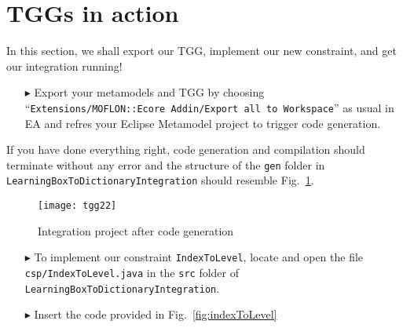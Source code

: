 \newpage
\section{TGGs in action}
\genHeader
\label{sect:TGGs_in_Action}
In this section, we shall export our TGG, implement our new constraint, and get our integration running!

\begin{enumerate}
\item[$\blacktriangleright$] Export your metamodels and TGG by choosing ``\texttt{Extensions/\-MOFLON::\-Ecore Addin\-/Export all to Workspace}'' as usual in EA and refres your Eclipse Metamodel project to trigger code generation.
\end{enumerate}

If you have done everything right, code generation and compilation should terminate without any error and the structure of the \texttt{gen} folder in \texttt{LearningBox\-To\-Dictionary\-Integration} should resemble Fig.~\ref{fig:gen_folder}.

\begin{figure}[htbp]
\begin{center}
  \texttt{[image: tgg22]}
  \caption{Integration project after code generation}
  \label{fig:gen_folder}
\end{center}
\end{figure}

\begin{enumerate}
  \item[$\blacktriangleright$] To implement our constraint \texttt{IndexToLevel}, locate and open the file \texttt{csp/IndexToLevel.java} in the \texttt{src} folder of \texttt{Learning\-Box\-To\-Dictionary\-Integration}.
  \item[$\blacktriangleright$] Insert the code provided in Fig.~\ref{fig:indexToLevel}

\end{enumerate}


